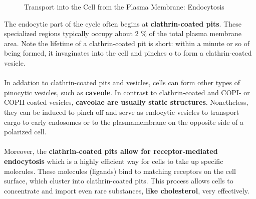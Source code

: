 \documentclass[../main.tex]{subfiles}
\begin{document}
\begin{figure}[H]
	\centering
	\caption{Transport into the Cell from the Plasma Membrane: Endocytosis}
\end{figure}

The endocytic part of the cycle often begins at \textbf{clathrin-coated pits}. These specialized regions typically occupy about 2 \% of the total plasma membrane area. Note the lifetime of a clathrin-coated pit is short: within a minute or so of being formed, it invaginates into the cell and pinches o to form a clathrin-coated vesicle. \\
\\
In addation to clathrin-coated pits and vesicles, cells can form other types of pinocytic vesicles, such as \textbf{caveole}. In contrast to clathrin-coated and COPI- or COPII-coated vesicles, \textbf{caveolae are usually static structures}. Nonetheless, they can be induced to pinch off and serve as endocytic vesicles to transport cargo to early endosomes or to the plasmamembrane on the opposite side of a polarized cell. \\
\\
Moreover, the \textbf{clathrin-coated pits allow for receptor-mediated endocytosis} which is a highly efficient way for cells to take up specific molecules. These molecules (ligands) bind to matching receptors on the cell surface, which cluster into clathrin-coated pits. This process allows cells to concentrate and import even rare substances, \textbf{like cholesterol}, very effectively.
\end{document}
